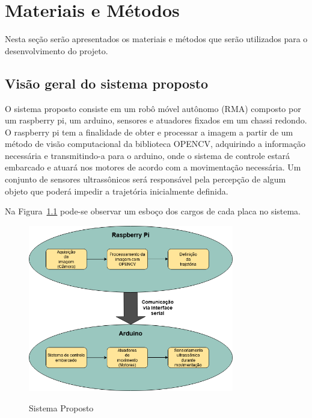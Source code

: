 \chapter{Materiais e Métodos}
\label{chap:mat_met}

Nesta seção serão apresentados os materiais e métodos que serão utilizados para o desenvolvimento do projeto.

\section{Visão geral do sistema proposto}
\label{sec:visao}

O sistema proposto consiste em um robô móvel autônomo (RMA) composto por um raspberry pi, um arduino, sensores e atuadores fixados em um chassi redondo. O raspberry pi tem a finalidade de obter e processar a imagem a partir de um método de visão computacional da biblioteca OPENCV, adquirindo a informação necessária e transmitindo-a para o arduino, onde o sistema de controle estará embarcado e atuará nos motores de acordo com a movimentação necessária. Um conjunto de sensores ultrassônicos será responsável pela percepção de algum objeto que poderá impedir a trajetória inicialmente definida.

Na Figura~\ref{fig:sistema-proposto} pode-se observar um esboço dos cargos de cada placa no sistema.

\begin{figure}[!hbtp]
  \centering
   \caption{Sistema Proposto}
    \includegraphics[width = 0.8\textwidth]{Caps/Figs/mat-met/Sistema-proposto.png}
   \label{fig:sistema-proposto}
\end{figure}

